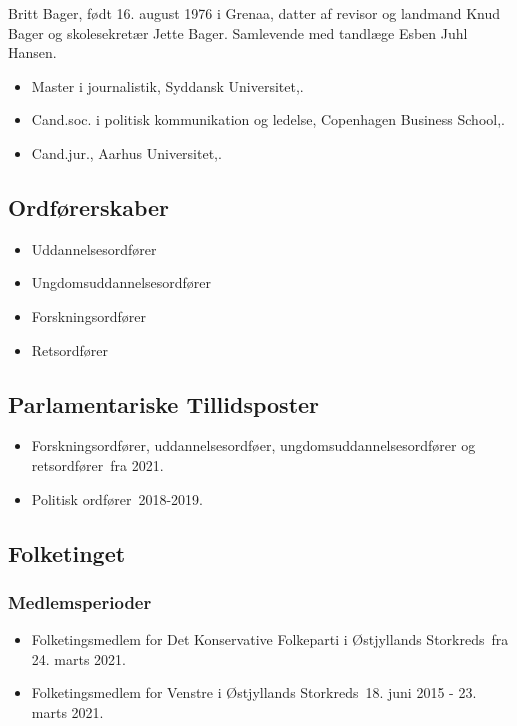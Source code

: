 \documentclass[11pt, a4paper]{awesome-cv}
\begin{document}
\makecvheader[R]
\makelettertitle
\begin{cvletter}
Britt Bager, født 16. august 1976 i Grenaa, datter af revisor og landmand Knud Bager og skolesekretær Jette Bager. Samlevende med tandlæge Esben Juhl Hansen.

\begin{itemize}
\item Master i journalistik, Syddansk Universitet,.
\item Cand.soc. i politisk kommunikation og ledelse, Copenhagen Business School,.
\item Cand.jur., Aarhus Universitet,.
\end{itemize}
\subsection*{Ordførerskaber}
\begin{itemize}
\item Uddannelsesordfører
\item Ungdomsuddannelsesordfører
\item Forskningsordfører
\item Retsordfører
\end{itemize}
\subsection*{Parlamentariske Tillidsposter}
\begin{itemize}
\item Forskningsordfører, uddannelsesordføer, ungdomsuddannelsesordfører og retsordfører fra 2021.
\item Politisk ordfører 2018-2019.
\end{itemize}
\subsection*{Folketinget}
\subsubsection*{Medlemsperioder}
\begin{itemize}
\item Folketingsmedlem for Det Konservative Folkeparti i Østjyllands Storkreds fra 24. marts 2021.
\item Folketingsmedlem for Venstre i Østjyllands Storkreds 18. juni 2015 - 23. marts 2021.
\end{itemize}

\end{cvletter}
\end{document}
